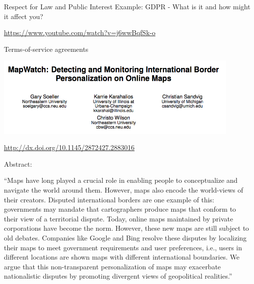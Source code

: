 \documentclass{beamer}
\def\vf{\vfill}
\begin{document}
\begin{frame}{Respect for Law and Public Interest}
Example: GDPR - What is it and how might it affect you?

\url{https://www.youtube.com/watch?v=j6wwBqfSk-o}

\end{frame}





\begin{frame}{Terms-of-service agreements}

\begin{center}
\includegraphics[width=0.9\textwidth]{figures/soeller_mapwatch_2016_title.png}
\end{center}

\vf
\url{http://dx.doi.org/10.1145/2872427.2883016}
\end{frame}
\begin{frame}

Abstract:\\
\vspace{1mm}
\begin{small}
``Maps have long played a crucial role in enabling people to conceptualize and navigate the world around them. However, maps also encode the world-views of their creators. Disputed international borders are one example of this: governments may mandate that cartographers produce maps that conform to their view of a territorial dispute. Today, online maps maintained by private corporations have become the norm. However, these new maps are still subject to old debates. Companies like Google and Bing resolve these disputes by localizing their maps to meet government requirements and user preferences, i.e., users in different locations are shown maps with different international boundaries. We argue that this non-transparent personalization of maps may exacerbate nationalistic disputes by promoting divergent views of geopolitical realities.''
\end{small}
\end{frame}
\end{document}
